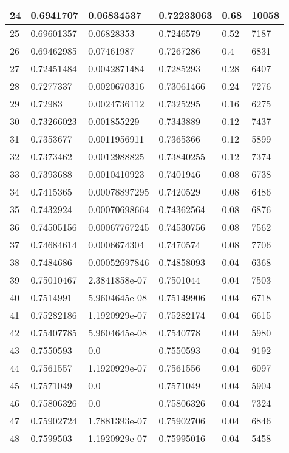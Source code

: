 \begin{longtable}{|l|l|l|l|l|l|}
24 & 0.6941707 & 0.06834537 & 0.72233063 & 0.68 & 10058 \\ \hline 
25 & 0.69601357 & 0.06828353 & 0.7246579 & 0.52 & 7187 \\ \hline 
26 & 0.69462985 & 0.07461987 & 0.7267286 & 0.4 & 6831 \\ \hline 
27 & 0.72451484 & 0.0042871484 & 0.7285293 & 0.28 & 6407 \\ \hline 
28 & 0.7277337 & 0.0020670316 & 0.73061466 & 0.24 & 7276 \\ \hline 
29 & 0.72983 & 0.0024736112 & 0.7325295 & 0.16 & 6275 \\ \hline 
30 & 0.73266023 & 0.001855229 & 0.7343889 & 0.12 & 7437 \\ \hline 
31 & 0.7353677 & 0.0011956911 & 0.7365366 & 0.12 & 5899 \\ \hline 
32 & 0.7373462 & 0.0012988825 & 0.73840255 & 0.12 & 7374 \\ \hline 
33 & 0.7393688 & 0.0010410923 & 0.7401946 & 0.08 & 6738 \\ \hline 
34 & 0.7415365 & 0.00078897295 & 0.7420529 & 0.08 & 6486 \\ \hline 
35 & 0.7432924 & 0.00070698664 & 0.74362564 & 0.08 & 6876 \\ \hline 
36 & 0.74505156 & 0.00067767245 & 0.74530756 & 0.08 & 7562 \\ \hline 
37 & 0.74684614 & 0.0006674304 & 0.7470574 & 0.08 & 7706 \\ \hline 
38 & 0.7484686 & 0.00052697846 & 0.74858093 & 0.04 & 6368 \\ \hline 
39 & 0.75010467 & 2.3841858e-07 & 0.7501044 & 0.04 & 7503 \\ \hline 
40 & 0.7514991 & 5.9604645e-08 & 0.75149906 & 0.04 & 6718 \\ \hline 
41 & 0.75282186 & 1.1920929e-07 & 0.75282174 & 0.04 & 6615 \\ \hline 
42 & 0.75407785 & 5.9604645e-08 & 0.7540778 & 0.04 & 5980 \\ \hline 
43 & 0.7550593 & 0.0 & 0.7550593 & 0.04 & 9192 \\ \hline 
44 & 0.7561557 & 1.1920929e-07 & 0.7561556 & 0.04 & 6097 \\ \hline 
45 & 0.7571049 & 0.0 & 0.7571049 & 0.04 & 5904 \\ \hline 
46 & 0.75806326 & 0.0 & 0.75806326 & 0.04 & 7324 \\ \hline 
47 & 0.75902724 & 1.7881393e-07 & 0.75902706 & 0.04 & 6846 \\ \hline 
48 & 0.7599503 & 1.1920929e-07 & 0.75995016 & 0.04 & 5458 \\ \hline 

\end{longtable}
